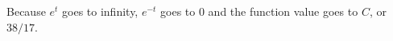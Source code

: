 \documentclass[11pt,answers]{exam}
\begin{document}
\begin{questions}
\begin{solution}
Because $e^t$ goes to infinity, $e^{-t}$ goes to 0 and the function value goes to $C$, or $38/17$.

\end{solution}



\end{questions}
\end{document}
